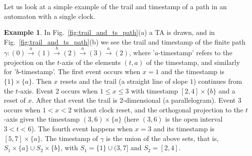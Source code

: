 \documentclass[11pt]{amsart}
\theoremstyle{definition}
\newtheorem{example}[theorem]{Example}
\begin{document}
Let us look at a simple example of the trail and timestamp of a path in an automaton with a single clock.
\begin{example}
	In Fig.~\ref{fig:trail_and_ts_path}(a) a TA is drawn, and in Fig.~\ref{fig:trail_and_ts_path}(b) we see the trail and timestamp of the finite path $\gamma: (0) \xrightarrow{a} (1) \xrightarrow{b} (2) \xrightarrow{a} (3) \xrightarrow{a} (2)$, where '$a$-timestamp' refers to the projection on the $t$-axis of the elements $(t,a)$ of the timestamp, and similarly for '$b$-timestamp'.
	The first event occurs when $x = 1$ and the timestamp is $\{1\} \times \{a\}$.
	Then $x$ resets and the trail (a straight line of slope $1$) continues from the $t$-axis.
	Event 2 occurs when $1 \leq x \leq 3$ with timestamp $[2,4] \times \{b\}$ and a reset of $x$.
	After that event the trail is 2-dimensional (a parallelogram).
	Event $3$ occurs when $1 < x < 2$ without clock reset, and the orthogonal projection to the $t$-axis gives the timestamp $(3,6) \times \{a\}$ (here $(3,6)$ is the open interval $3 < t < 6$).
	The fourth event happens when $x = 3$ and its timestamp is $[5,7] \times \{a\}$.
	The timestamp of $\gamma$ is the union of the above sets, that is, $S_1 \times \{a\} \cup S_2 \times \{b\}$, with $S_1 = \{1\} \cup (3,7]$ and $S_2 = [2,4]$.
	\begin{figure}[htb]
\centering
\end{figure}
\end{example}
\end{document}
